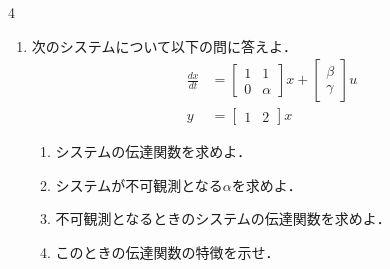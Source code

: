 \documentclass[fleqn]{article}
\renewcommand{\bmatrix}{\left[\begin{array}}
\newcommand{\ematrix}{\end{array}\right]}
\begin{document}
\begin{multicols}{4}
\begin{enumerate}
\begin{enumerate}

\item 
オブザーバゲイン$K$の次元に注意してオブザーバの状態方程式を示せ．
\vspace{6cm}

\item
オブザーバの極（推定誤差の収束速さ）が$-1$, $-2$となるようにオブザーバゲイン$K$を求めよ．
\vspace{12cm}

\end{enumerate}
\vfill\null
\columnbreak





\item
次のシステムについて以下の問に答えよ．
\begin{align}
	\frac{dx}{dt}
	&=	\bmatrix{cc}
			1 & 1 \\
			0 & \alpha
		\ematrix
		x
		+
		\bmatrix{c}
			\beta \\
			\gamma
		\ematrix
		u
\nonumber \\
	y 
	&=	\bmatrix{cc}
			1 & 2 
		\ematrix
		x
\nonumber 
\end{align}

\begin{enumerate}

\item 
システムの伝達関数を求めよ．
\vspace{8cm}

\item
システムが不可観測となる$\alpha$を求めよ．
\vspace{8cm}

\item
不可観測となるときのシステムの伝達関数を求めよ．
\vspace{3cm}

\item
このときの伝達関数の特徴を示せ．
\vspace{3cm}

\end{enumerate}
\vfill\null
\columnbreak







\end{enumerate}
\end{multicols}
\end{document}
